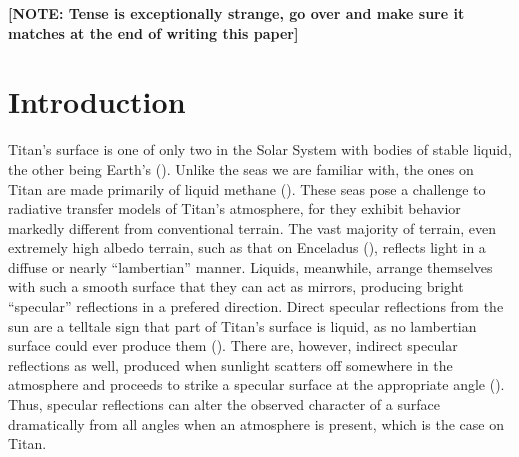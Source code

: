 \documentclass[linenumbers]{aastex631}
\begin{document}
\pagestyle{fancy}
\fancyhead{}
\maketitle

\begin{abstract}
\textbf{\color{red}ABSTRACTION: this will be done last, as we need to know the end from the beginning to properly do it.\color{black}}
\end{abstract}

\textbf{\color{red} [NOTE: Tense is exceptionally strange, go over and make sure it matches at the end of writing this paper] \color{black}}
 

\section{Introduction}
Titan's surface is one of only two in the Solar System with bodies of stable liquid, the other being Earth's (\cite{Hayes2016}). Unlike the seas we are familiar with, the ones on Titan are made primarily of liquid methane (\cite{Mastrogiuseppe2016}). These seas pose a challenge to radiative transfer models of Titan's atmosphere, for they exhibit behavior markedly different from conventional terrain. The vast majority of terrain, even extremely high albedo terrain, such as that on Enceladus (\cite{Li2023}), reflects light in a diffuse or nearly ``lambertian'' manner. Liquids, meanwhile, arrange themselves with such a smooth surface that they can act as mirrors, producing bright ``specular'' reflections in a prefered direction. Direct specular reflections from the sun are a telltale sign that part of Titan's surface is liquid, as no lambertian surface could ever produce them (\cite{Stephan2010}). There are, however, indirect specular reflections as well, produced when sunlight scatters off somewhere in the atmosphere and proceeds to strike a specular surface at the appropriate angle (\cite{Vixie2015}). Thus, specular reflections can alter the observed character of a surface dramatically from all angles when an atmosphere is present, which is the case on Titan.
\end{document}
